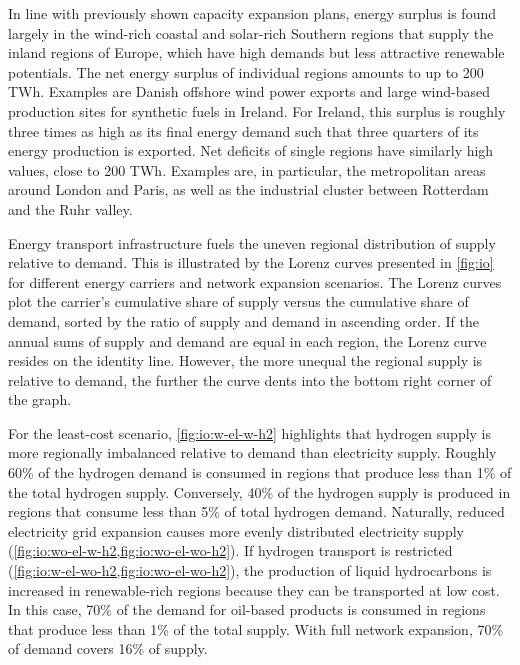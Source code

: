 In line with previously shown capacity expansion plans, energy surplus is found
largely in the wind-rich coastal and solar-rich Southern regions that supply the
inland regions of Europe, which have high demands but less attractive renewable
potentials. The net energy surplus of individual regions amounts to up to 200
TWh. Examples are Danish offshore wind power exports and large wind-based
production sites for synthetic fuels in Ireland. For Ireland, this surplus is
roughly three times as high as its final energy demand such that three quarters
of its energy production is exported. Net deficits of single regions have
similarly high values, close to 200 TWh. Examples are, in particular, the
metropolitan areas around London and Paris, as well as the industrial cluster
between Rotterdam and the Ruhr valley.

Energy transport infrastructure fuels the uneven regional distribution of supply
relative to demand. This is illustrated by the Lorenz curves presented in
\cref{fig:io} for different energy carriers and network expansion scenarios. The
Lorenz curves plot the carrier's cumulative share of supply versus the
cumulative share of demand, sorted by the ratio of supply and demand in
ascending order. If the annual sums of supply and demand are equal in each
region, the Lorenz curve resides on the identity line. However, the more unequal
the regional supply is relative to demand, the further the curve dents into the
bottom right corner of the graph.

For the least-cost scenario, \cref{fig:io:w-el-w-h2} highlights that hydrogen
supply is more regionally imbalanced relative to demand than electricity supply.
Roughly 60\% of the hydrogen demand is consumed in regions that produce less
than 1\% of the total hydrogen supply. Conversely, 40\% of the hydrogen supply
is produced in regions that consume less than 5\% of total hydrogen demand.
Naturally, reduced electricity grid expansion causes more evenly distributed
electricity supply (\cref{fig:io:wo-el-w-h2,fig:io:wo-el-wo-h2}). If hydrogen
transport is restricted (\cref{fig:io:w-el-wo-h2,fig:io:wo-el-wo-h2}), the
production of liquid hydrocarbons is increased in renewable-rich regions because
they can be transported at low cost. In this case, 70\% of the demand for
oil-based products is consumed in regions that produce less than 1\% of the
total supply. With full network expansion, 70\% of demand covers 16\% of supply.


